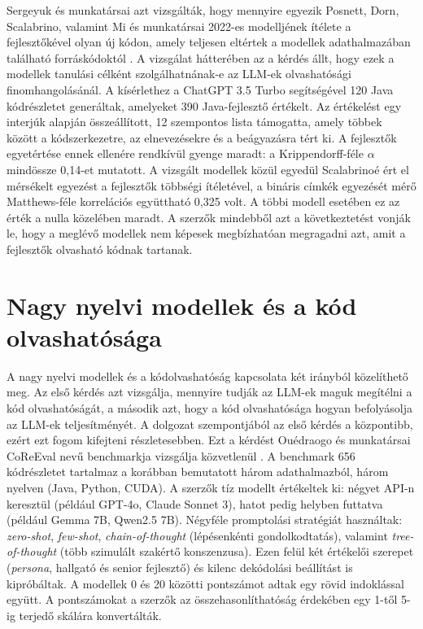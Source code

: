 \documentclass[
]{elteikthesis}[2024/04/26]
\begin{document}
Sergeyuk és munkatársai azt vizsgálták, hogy
mennyire egyezik Posnett, Dorn, Scalabrino, valamint Mi és munkatársai 2022-es
modelljének ítélete a fejlesztőkével olyan új kódon, amely teljesen eltértek a
modellek adathalmazában található forráskódoktól \cite{sergeyuk2024reassessing}.
A vizsgálat hátterében az a kérdés állt, hogy ezek a modellek tanulási célként
szolgálhatnának-e az LLM-ek olvashatósági finomhangolásánál. A kísérlethez a
ChatGPT 3.5 Turbo segítségével 120 Java kódrészletet generáltak, amelyeket 390
Java-fejlesztő értékelt. Az értékelést egy interjúk alapján összeállított, 12
szempontos lista támogatta, amely többek között a kódszerkezetre, az
elnevezésekre és a beágyazásra tért ki. A fejlesztők egyetértése ennek ellenére
rendkívül gyenge maradt: a Krippendorff-féle $\alpha$ mindössze 0,14-et
mutatott. A vizsgált modellek közül egyedül Scalabrinoé ért el mérsékelt
egyezést a fejlesztők többségi ítéletével, a bináris címkék egyezését mérő
Matthews-féle korrelációs együttható 0,325 volt. A többi modell esetében ez az
érték a nulla közelében maradt. A szerzők mindebből azt a következtetést vonják
le, hogy a meglévő modellek nem képesek megbízhatóan megragadni azt, amit a
fejlesztők olvasható kódnak tartanak.

\section{Nagy nyelvi modellek és a kód olvashatósága}
\label{sec:related:llm}

A nagy nyelvi modellek és a kódolvashatóság kapcsolata két irányból közelíthető
meg. Az első kérdés azt vizsgálja, mennyire tudják az LLM-ek maguk megítélni a
kód olvashatóságát, a második azt, hogy a kód olvashatósága hogyan befolyásolja
az LLM-ek teljesítményét. A dolgozat szempontjából az első kérdés a központibb,
ezért ezt fogom kifejteni részletesebben. Ezt a kérdést Ouédraogo és munkatársai
CoReEval nevű benchmarkja vizsgálja közvetlenül \cite{ouedraogo2025coreeval}. A
benchmark 656 kódrészletet tartalmaz a korábban bemutatott három adathalmazból,
három nyelven (Java, Python, CUDA). A szerzők tíz modellt értékeltek ki: négyet
API-n keresztül (például GPT-4o, Claude Sonnet 3), hatot pedig helyben futtatva
(például Gemma 7B, Qwen2.5 7B). Négyféle promptolási stratégiát használtak:
\textit{zero-shot}, \textit{few-shot}, \textit{chain-of-thought} (lépésenkénti
gondolkodtatás), valamint \textit{tree-of-thought} (több szimulált szakértő
konszenzusa). Ezen felül két értékelői szerepet (\textit{persona}, hallgató és
senior fejlesztő) és kilenc dekódolási beállítást is kipróbáltak. A modellek 0
és 20 közötti pontszámot adtak egy rövid indoklással együtt. A pontszámokat a
szerzők az összehasonlíthatóság érdekében egy 1-től 5-ig terjedő skálára
konvertálták.
\end{document}
